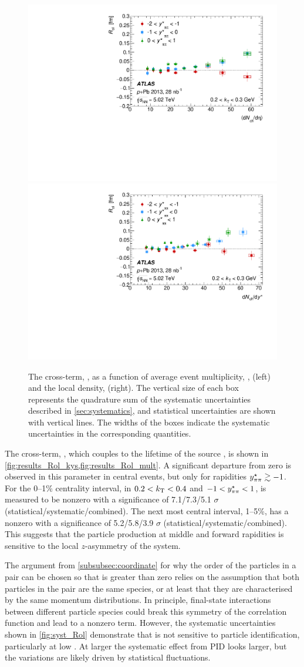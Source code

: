 \begin{figure}[t]
\centering
\includegraphics[width=0.49\linewidth]{canqosl_Rol_kt1_kys_vs_avg_mult.pdf}
\includegraphics[width=0.49\linewidth]{canqosl_Rol_kt1_vs_mult.pdf}
\caption{The cross-term, \Rol, as a function of average event multiplicity, \avgdNdeta, (left) and the local density, \dNdy (right). The vertical size of each box represents the quadrature sum of the systematic uncertainties described in \cref{sec:systematics}, and statistical uncertainties are shown with vertical lines. The widths of the boxes indicate the systematic uncertainties in the corresponding quantities.}
\label{fig:results_Rol_mult}
\end{figure}

The cross-term, \Rol, which couples to the lifetime of the source \cite{Chapman:1994yv}, is shown in \cref{fig:results_Rol_kys,fig:results_Rol_mult}.
A significant departure from zero is observed in this parameter in central events, but only for rapidities $y^{\star}_{\pi\pi} \gtrsim -1$.
For the 0--1\% centrality interval, in $ 0.2 < k_\mathrm{T} < 0.4$ and $-1 < y^{\star}_{\pi\pi} < 1$, \Rol is measured to be nonzero with a significance of 7.1/7.3/5.1 $\sigma$ (statistical/systematic/combined).
The next most central interval, 1--5\%, has a nonzero \Rol with a significance of 5.2/5.8/3.9 $\sigma$ (statistical/systematic/combined).
This suggests that the particle production at middle and forward rapidities is sensitive to the local $z$-asymmetry of the system.

The argument from \cref{subsubsec:coordinate} for why the order of the particles in a pair can be chosen so that \qout is greater than zero relies on the assumption that both particles in the pair are the same species, or at least that they are characterised by the same momentum distributions.
In principle, final-state interactions between different particle species could break this symmetry of the correlation function and lead to a nonzero \Rol term. 
However, the systematic uncertainties shown in \cref{fig:syst_Rol} demonstrate that \Rol is not sensitive to particle identification, particularly at low \kt.
At larger \kt the systematic effect from \ac{PID} looks larger, but the variations are likely driven by statistical fluctuations.

